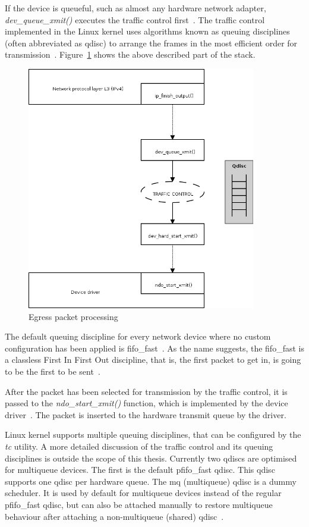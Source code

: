 If the device is queueful, such as almost any hardware network adapter, {\it{dev\_queue\_xmit()}}
executes the traffic control first~\cite{understanding-internals}.
The traffic control implemented in the Linux kernel uses algorithms known as queuing disciplines
(often abbreviated as qdisc)
to arrange the frames in the most efficient order for transmission~\cite{understanding-internals}.
Figure~\ref{fig:linux-egress-packet} shows the above described part of the stack.
\begin{figure}
	\centering
	\includegraphics[width=10cm,keepaspectratio]{fig/kernel-layer2-flow.png}
	\caption{Egress packet processing}
	\label{fig:linux-egress-packet}
	\bigskip
\end{figure}

The default queuing discipline for every network device where
no custom configuration has been applied is fifo\_fast~\cite{linux-kernel-networking}.
As the name suggests, the fifo\_fast is a classless First In First Out discipline,
that is, the first packet to get in, is going to be the first to be sent~\cite{tcpip-in-linux}.

After the packet has been selected for transmission by the traffic control, it is passed to the
{\it{ndo\_start\_xmit()}} function, which is implemented by the device driver~\cite{kernel-source}.
The packet is inserted to the hardware transmit queue by the driver.

Linux kernel supports multiple queuing disciplines, that can be configured by the {\it{tc}} utility.
A more detailed discussion of the traffic control and its queuing disciplines is outside the scope of this thesis.
Currently two qdiscs are optimised for multiqueue devices.
The first is the default pfifo\_fast qdisc.
This qdisc supports one qdisc per hardware queue.
The mq (multiqueue) qdisc is a dummy scheduler.
It is used by default for multiqueue devices instead of the regular pfifo\_fast qdisc,
but can also be attached manually to restore multiqueue behaviour
after attaching a non-multiqueue (shared) qdisc~\cite{kernel-doc-multiqueue}.

